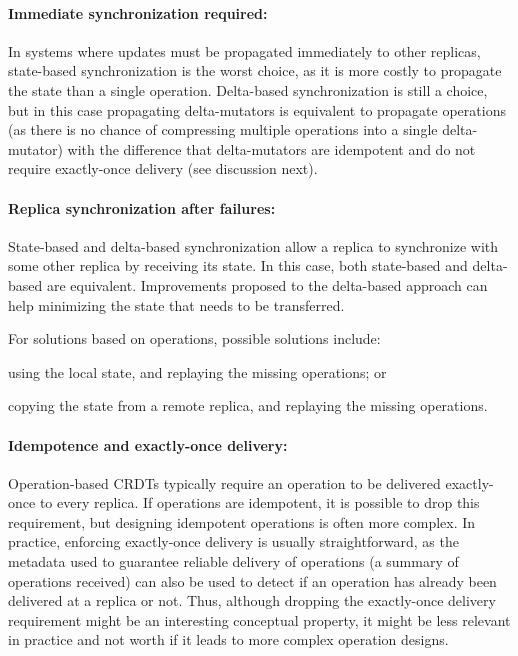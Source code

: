 \documentclass[11pt,a4paper]{article}
\begin{document}
\paragraph{Immediate synchronization required:} In systems where updates
must be propagated immediately to other replicas, state-based synchronization 
is the worst choice, as it is more costly to propagate the state than a
single operation. 
Delta-based synchronization is still a choice, but in this
case propagating delta-mutators is equivalent to propagate operations (as
there is no chance of compressing multiple operations into a single delta-mutator) 
with the difference that delta-mutators are idempotent and do not require 
exactly-once delivery (see discussion next).

\paragraph{Replica synchronization after failures:} State-based and delta-based 
synchronization allow a replica to synchronize with some other replica by receiving its
state. In this case, both state-based and delta-based are equivalent.
Improvements proposed to the delta-based approach can help minimizing the 
state that needs to be transferred.

For solutions based on operations, possible solutions include:
\begin{inparaenum}[(i)]
\item using the local state, and replaying the missing operations; or
\item copying the state from a remote replica, and replaying the missing operations.
\end{inparaenum}

\paragraph{Idempotence and exactly-once delivery:} Operation-based CRDTs 
typically require an operation to be delivered exactly-once to every replica.
If operations are idempotent, it is possible to drop this requirement, but
designing idempotent operations is often more complex. 
In practice, enforcing exactly-once delivery is usually straightforward, 
as the metadata used to guarantee reliable delivery of operations (a summary
of operations received) can also be used to detect if an operation has 
already been delivered at a replica or not. 
Thus, although dropping the exactly-once delivery requirement might be an
interesting conceptual property, it might be less relevant in practice and
not worth if it leads to more complex operation designs.
\end{document}
